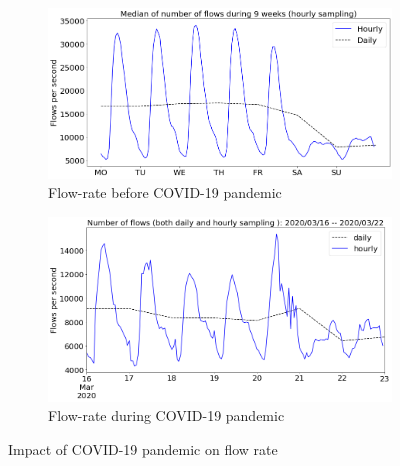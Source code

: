 \documentclass[10pt, journal, letterpaper]{IEEEtran}
\newcommand\linearFigSze{0.48}
\begin{document}
\begin{figure}
    \begin{subfigure}{\linearFigSze\textwidth}
          \centering
          \includegraphics[width=\columnwidth]{img/BCO_flowrate.png}
          \caption{Flow-rate before COVID-19 pandemic}
          \label{fig:BCO_fps}
    \end{subfigure}
    \begin{subfigure}{\linearFigSze\textwidth}
          \centering
          \includegraphics[width=\columnwidth]{img/CO2_flowrate.png}
          \caption{Flow-rate during COVID-19 pandemic}
          \label{fig:CO_fps}
    \end{subfigure}
    \caption{Impact of COVID-19 pandemic on flow rate}
    \label{fig:flowrate_BCO_CO}
\end{figure}
\end{document}
